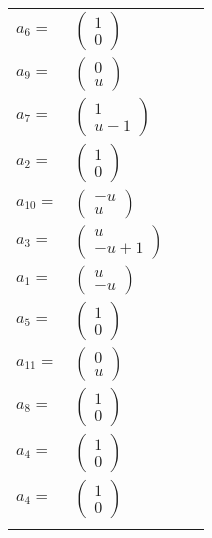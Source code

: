 \documentclass[1p]{elsarticle_modified}
\theoremstyle{definition}
\begin{document}
\begin{tabular}{m{7pt} m{180pt} m{7pt} m{180pt} }
\flushright $a_{6}=$&$\begin{pmatrix}1\\0\end{pmatrix}$ \\
\flushright $a_{9}=$&$\begin{pmatrix}0\\u\end{pmatrix}$ \\
\flushright $a_{7}=$&$\begin{pmatrix}1\\u-1\end{pmatrix}$ \\
\flushright $a_{2}=$&$\begin{pmatrix}1\\0\end{pmatrix}$ \\
\flushright $a_{10}=$&$\begin{pmatrix}- u\\u\end{pmatrix}$ \\
\flushright $a_{3}=$&$\begin{pmatrix}u\\- u+1\end{pmatrix}$ \\
\flushright $a_{1}=$&$\begin{pmatrix}u\\- u\end{pmatrix}$ \\
\flushright $a_{5}=$&$\begin{pmatrix}1\\0\end{pmatrix}$ \\
\flushright $a_{11}=$&$\begin{pmatrix}0\\u\end{pmatrix}$ \\
\flushright $a_{8}=$&$\begin{pmatrix}1\\0\end{pmatrix}$ \\
\flushright $a_{4}=$&$\begin{pmatrix}1\\0\end{pmatrix}$\\ \flushright $a_{4}=$&$\begin{pmatrix}1\\0\end{pmatrix}$\\&\end{tabular}
\end{document}
